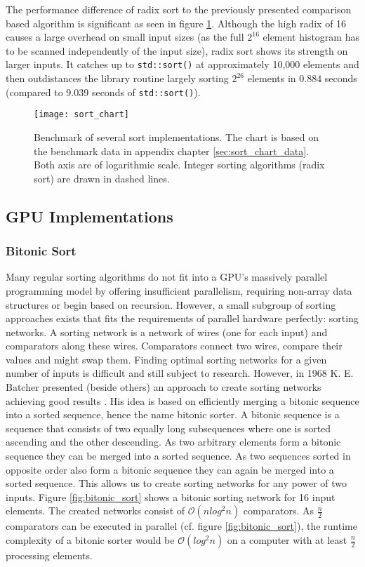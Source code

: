 The performance difference of radix sort to the previously presented comparison based algorithm is significant as seen in figure \ref{fig:sort_chart}. Although the high radix of 16 causes a large overhead on small input sizes (as the full $2^{16}$ element histogram has to be scanned independently of the input size), radix sort shows its strength on larger inputs. It catches up to \lstinline!std::sort()! at approximately 10,000 elements and then outdistances the library routine largely sorting $2^{26}$ elements in 0.884 seconds (compared to 9.039 seconds of \lstinline!std::sort()!).

\begin{figure}[h]
\centering
\texttt{[image: sort\_chart]}
\caption{Benchmark of several sort implementations. The chart is based on the benchmark data in appendix chapter \ref{sec:sort_chart_data}. Both axis are of logarithmic scale. Integer sorting algorithms (radix sort) are drawn in dashed lines.}
\label{fig:sort_chart}
\end{figure}

\subsection{GPU Implementations}

\subsubsection{Bitonic Sort}

Many regular sorting algorithms do not fit into a GPU's massively parallel programming model by offering insufficient parallelism, requiring non-array data structures or begin based on recursion. However, a small subgroup of sorting approaches exists that fits the requirements of parallel hardware perfectly: sorting networks. A sorting network is a network of wires (one for each input) and comparators along these wires. Comparators connect two wires, compare their values and might swap them.
Finding optimal sorting networks for a given number of inputs is difficult and still subject to research. However, in 1968 K. E. Batcher presented (beside others) an approach to create sorting networks achieving good results \cite{sort_bitonic}. His idea is based on efficiently merging a bitonic sequence into a sorted sequence, hence the name bitonic sorter. A bitonic sequence is a sequence that consists of two equally long subsequences where one is sorted ascending and the other descending. As two arbitrary elements form a bitonic sequence they can be merged into a sorted sequence. As two sequences sorted in opposite order also form a bitonic sequence they can again be merged into a sorted sequence. This allows us to create sorting networks for any power of two inputs. Figure \ref{fig:bitonic_sort} shows a bitonic sorting network for 16 input elements. The created networks consist of $\mathcal{O}(n  log^2 n)$ comparators. As $\frac{n}{2}$ comparators can be executed in parallel (cf. figure \ref{fig:bitonic_sort}), the runtime complexity of a bitonic sorter would be $\mathcal{O}(log^2 n)$ on a computer with at least $\frac{n}{2}$ processing elements.

